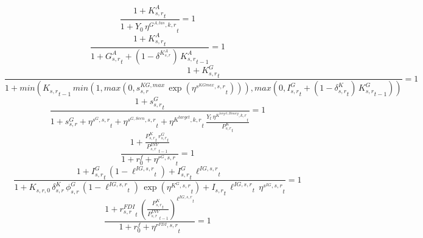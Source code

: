 \noindent[name= `sector specific adaptation capital target from government expenditure 1 1']
\begin{dmath}
\frac{1+{{K^{A}_{s,r}}}_{t}}{1+{{Y_0}}\, {{\eta^{G^{A,tas},k,r}}}_{t}}=1
\end{dmath}
\noindent[name= `sector specific adaptation capital against climate change 1 1']
\begin{dmath}
\frac{1+{{K^{A}_{s,r}}}_{t}}{1+{{G^{A}_{s,r}}}_{t}+\left(1-{{\delta^{K^{A}_{s,r}}}}\right)\, {{K^{A}_{s,r}}}_{t-1}}=1
\end{dmath}
\noindent[name= `sector specific public capital 1 1']
\begin{dmath}
\frac{1+{{K^G_{s,r}}}_{t}}{1+min({{K_{s,r}}}_{t-1}\, min(1,max(0,{{s^{KG,max}_{s,r}}}\, \exp\left({{\eta^{s^{KGmax},s,r}}}_{t}\right))),max(0,{{I^G_{s,r}}}_{t}+\left(1-{{\delta^{K}_{s,r}}}_{t}\right)\, {{K^G_{s,r}}}_{t-1}))}=1
\end{dmath}
\noindent[name= `sector specific public investment 1 1']
\begin{dmath}
\frac{1+{{s^G_{s,r}}}_{t}}{1+{{s^{G}_{s,r}}}+{{\eta^{s^G,s,r}}}_{t}+{{\eta^{s^{G,Scen},s,r}}}_{t}+{{\eta^{K^{target},k,r}}}_{t}\, \frac{{Y}_{t}\, {{\eta^{K^{target,Binary},k,r}}}_{t}}{{{P^K_{s,r}}}_{t}}}=1
\end{dmath}
\noindent[name= `sector specific public rental rate 1 1']
\begin{dmath}
\frac{1+\frac{{{P^K_{s,r}}}_{t}\, {{r^G_{s,r}}}_{t}}{{{P^{INV}_{s,r}}}_{t-1}}}{1+{{r^f_0}}+{{\eta^{r^G,s,r}}}_{t}}=1
\end{dmath}
\noindent[name= `scenario sector specific public capital / investment share 1 1']
\begin{dmath}
\frac{1+{{I^G_{s,r}}}_{t}\, \left(1-{{\ell^{IG,s,r}}}_{t}\right)+{{I^G_{s,r}}}_{t}\, {{\ell^{IG,s,r}}}_{t}}{1+{{K_{s,r,0}}}\, {{\delta^{K}_{s,r}}}\, {{\phi^{G}_{s,r}}}\, \left(1-{{\ell^{IG,s,r}}}_{t}\right)\, \exp\left({{\eta^{K^G,s,r}}}_{t}\right)+{{I_{s,r}}}_{t}\, {{\ell^{IG,s,r}}}_{t}\, {{\eta^{s^{IG},s,r}}}_{t}}=1
\end{dmath}
\noindent[name= `FDI rental rate (returns to foreign investors) 1 1']
\begin{dmath}
\frac{1+{{r^{FDI}_{s,r}}}_{t}\, \left(\frac{{{P^K_{s,r}}}_{t}}{{{P^{INV}_{s,r}}}_{t-1}}\right)^{{{\ell^{IG,s,r}}}_{t}}}{1+{{r^f_0}}+{{\eta^{r^{FDI},s,r}}}_{t}}=1
\end{dmath}
\noindent[name= `taxes on household capital income 2 1']
